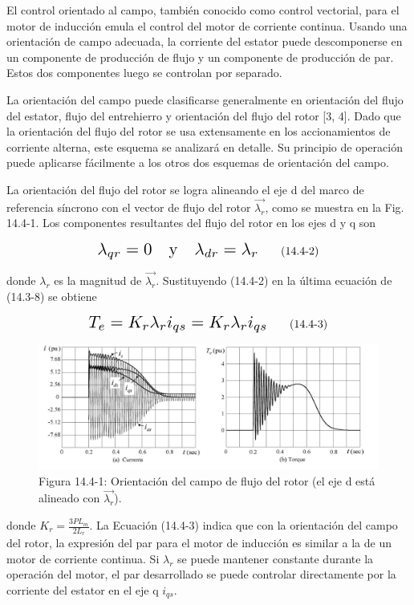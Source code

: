 \documentclass[letterpaper,12pt]{article} %
\begin{document}
El control orientado al campo, también conocido como control vectorial, para el motor de inducción emula el control del motor de corriente continua. Usando una orientación de campo adecuada, la corriente del estator puede descomponerse en un componente de producción de flujo y un componente de producción de par. Estos dos componentes luego se controlan por separado.

La orientación del campo puede clasificarse generalmente en orientación del flujo del estator, flujo del entrehierro y orientación del flujo del rotor [3, 4]. Dado que la orientación del flujo del rotor se usa extensamente en los accionamientos de corriente alterna, este esquema se analizará en detalle. Su principio de operación puede aplicarse fácilmente a los otros dos esquemas de orientación del campo.

La orientación del flujo del rotor se logra alineando el eje d del marco de referencia síncrono con el vector de flujo del rotor \( \vec{\lambda_r} \), como se muestra en la Fig. 14.4-1. Los componentes resultantes del flujo del rotor en los ejes d y q son

\[
\scalebox{1.5}{$\lambda_{qr} = 0 \quad \text{y} \quad \lambda_{dr} = \lambda_r$} \tag{14.4-2}
\]

donde \( \lambda_r \) es la magnitud de \( \vec{\lambda_r} \). Sustituyendo (14.4-2) en la última ecuación de (14.3-8) se obtiene

\[
\scalebox{1.5}{$T_e = K_r \lambda_r i_{qs} = K_r \lambda_r i_{qs}$} \tag{14.4-3}
\]


\begin{figure}[ht]
    \centering
    \includegraphics{graficos/img10.jpg} 
    \caption{Figura 14.4-1: Orientación del campo de flujo del rotor (el eje d está alineado con \( \vec{\lambda_r} \)).}
    \label{fig:14.4-1}
\end{figure}
\FloatBarrier

donde \( K_r = \frac{3P L_m}{2 L_r} \). La Ecuación (14.4-3) indica que con la orientación del campo del rotor, la expresión del par para el motor de inducción es similar a la de un motor de corriente continua. Si \( \lambda_r \) se puede mantener constante durante la operación del motor, el par desarrollado se puede controlar directamente por la corriente del estator en el eje q \( i_{qs} \).
\end{document}
